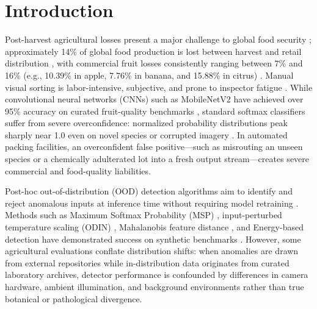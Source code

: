 \section{Introduction}
\label{sec:introduction}

Post-harvest agricultural losses present a major challenge to global food security \cite{fao2019state}; approximately 14\% of global food production is lost between harvest and retail distribution \cite{fao2019state}, with commercial fruit losses consistently ranging between 7\% and 16\% (e.g., 10.39\% in apple, 7.76\% in banana, and 15.88\% in citrus) \cite{jha2015assessment}. Manual visual sorting is labor-intensive, subjective, and prone to inspector fatigue \cite{rizzo2023fruit,zhang2024fruit}. While convolutional neural networks (CNNs) such as MobileNetV2 \cite{sandler2018mobilenetv2} have achieved over 95\% accuracy on curated fruit-quality benchmarks \cite{chen2024classification,gulzar2023fruit}, standard softmax classifiers suffer from severe overconfidence: normalized probability distributions peak sharply near 1.0 even on novel species or corrupted imagery \cite{guo2017calibration,hendrycks2017baseline}. In automated packing facilities, an overconfident false positive---such as misrouting an unseen species or a chemically adulterated lot into a fresh output stream---creates severe commercial and food-quality liabilities.

Post-hoc out-of-distribution (OOD) detection algorithms aim to identify and reject anomalous inputs at inference time without requiring model retraining \cite{scheirer2013toward,bendale2016towards,yang2024generalized}. Methods such as Maximum Softmax Probability (MSP) \cite{hendrycks2017baseline}, input-perturbed temperature scaling (ODIN) \cite{liang2018enhancing}, Mahalanobis feature distance \cite{lee2018simple}, and Energy-based detection \cite{liu2020energy} have demonstrated success on synthetic benchmarks \cite{vaze2022open}. However, some agricultural evaluations conflate distribution shifts: when anomalies are drawn from external repositories while in-distribution data originates from curated laboratory archives, detector performance is confounded by differences in camera hardware, ambient illumination, and background environments rather than true botanical or pathological divergence.

